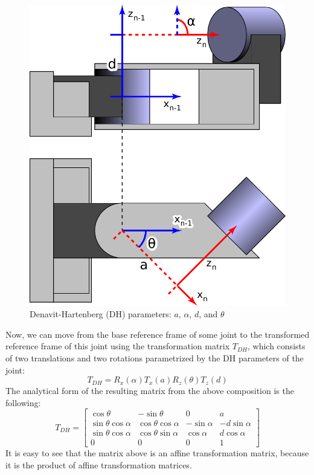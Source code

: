 \begin{figure}[t!]
	\begin{center}
		\includegraphics[height=.4\textheight]{Figures/Sample_Denavit-Hartenberg_Diagram.pdf}
 		\caption{Denavit-Hartenberg (DH) parameters: $a$, $\alpha$, $d$, and $\theta$~\cite{tekkotsu}}
 		\label{fig:DH}
	\end{center}
\end{figure}

Now, we can move from the base reference frame of some joint to the transformed reference frame of this joint using the transformation matrix $T_{DH}$, which consists of two translations and two rotations parametrized by the DH parameters of the joint:
\[T_{DH} = R_x(\alpha)T_x(a)R_z(\theta)T_z(d)\]
The analytical form of the resulting matrix from the above composition is the following:
\[
T_{DH} = 
\begin{bmatrix}
\cos\theta & -\sin\theta & 0 & a\\
\sin\theta\cos\alpha & \cos\theta\cos\alpha & -\sin\alpha & -d\sin\alpha\\
\sin\theta\cos\alpha & \cos\theta\sin\alpha & \cos\alpha & d\cos\alpha\\
0 & 0 & 0 & 1
\end{bmatrix}
\]
It is easy to see that the matrix above is an affine transformation matrix, because it is the product of affine transformation matrices.

